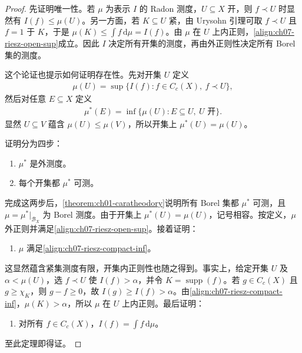 \documentclass[../../main.tex]{subfiles}
\begin{document}
\begin{proof}
先证明唯一性。若 $\mu$ 为表示 $I$ 的 Radon 测度，$U\subseteq X$ 开，则 $f\prec U$ 时显然有 $I(f)\leqslant\mu(U)$。另一方面，若 $K\subseteq U$ 紧，由 Urysohn 引理可取 $f\prec U$ 且 $f=1$ 于 $K$，于是 $\mu(K)\leqslant\int f\,\mathrm d\mu=I(f)$。由 $\mu$ 在 $U$ 上内正则，\eqref{align:ch07-riesz-open-sup}成立。因此 $I$ 决定所有开集的测度，再由外正则性决定所有 Borel 集的测度。

这个论证也提示如何证明存在性。先对开集 $U$ 定义
\begin{align*}
\mu(U)=\sup\{I(f):f\in C_c(X),\ f\prec U\},
\end{align*}
然后对任意 $E\subseteq X$ 定义
\begin{align*}
\mu^*(E)=\inf\{\mu(U):E\subseteq U,\ U\text{ 开}\}.
\end{align*}
显然 $U\subseteq V$ 蕴含 $\mu(U)\leqslant\mu(V)$，所以开集上 $\mu^*(U)=\mu(U)$。

证明分为四步：
\begin{enumerate}[label=\roman*.,ref=(\roman*)]
\item $\mu^*$ 是外测度。
\item 每个开集都 $\mu^*$ 可测。
\end{enumerate}
完成这两步后，\cref{theorem:ch01-caratheodory}说明所有 Borel 集都 $\mu^*$ 可测，且 $\mu=\mu^*|_{\mathscr B_X}$ 为 Borel 测度。由于开集上 $\mu^*(U)=\mu(U)$，记号相容。按定义，$\mu$ 外正则并满足\eqref{align:ch07-riesz-open-sup}。接着证明：
\begin{enumerate}[label=\roman*.,ref=(\roman*),start=3]
\item $\mu$ 满足\eqref{align:ch07-riesz-compact-inf}。
\end{enumerate}
这显然蕴含紧集测度有限，开集内正则性也随之得到。事实上，给定开集 $U$ 及 $\alpha<\mu(U)$，选 $f\prec U$ 使 $I(f)>\alpha$，并令 $K=\operatorname{supp}(f)$。若 $g\in C_c(X)$ 且 $g\geqslant\chi_K$，则 $g-f\geqslant0$，故 $I(g)\geqslant I(f)>\alpha$。由\eqref{align:ch07-riesz-compact-inf}，$\mu(K)>\alpha$，所以 $\mu$ 在 $U$ 上内正则。最后证明：
\begin{enumerate}[label=\roman*.,ref=(\roman*),start=4]
\item 对所有 $f\in C_c(X)$，$I(f)=\int f\,\mathrm d\mu$。
\end{enumerate}
至此定理即得证。


\end{proof}
\end{document}

